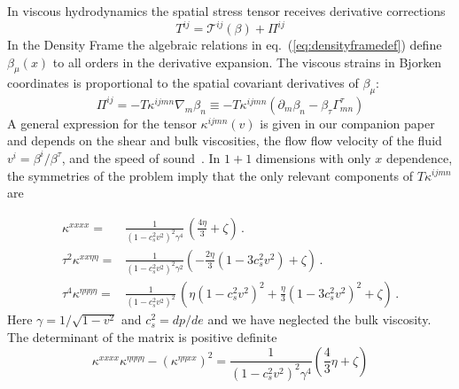 \documentclass[12pt,aps,preprint,nofootinbib,noshowkeys,noshowpacs,longbibliography,superscriptaddress,tightenlines]{revtex4-2}
\def\noisekernel{{\kappa}}
\def\Eq#1{eq.~(\ref{#1})}
\def\st{\begin{equation}}
\def\stp{\end{equation}}
\def\tideal{{\mathcal T}}
\begin{document}
In viscous hydrodynamics the spatial stress tensor  receives derivative corrections
\st
 T^{ij} = \tideal^{ij}(\beta) + \Pi^{ij}
\stp
In the Density Frame the algebraic relations in \Eq{eq:densityframedef} define $\beta_{\mu}(x)$ to all orders in the derivative expansion.
The viscous strains in Bjorken coordinates is proportional to the spatial covariant derivatives of $\beta_{\mu}$:
\st
\label{eq:covderiv}
\Pi^{ij} = -T\kappa^{ijmn} \nabla_{m} \beta_n \equiv - T\kappa^{ijmn} \left( \partial_m \beta_n - \beta_{\tau} \Gamma^{\tau}_{mn} \right)
\stp
A general expression for the tensor $\kappa^{ijmn}(v)$ is given in our companion paper and depends on the shear and bulk viscosities, the flow flow velocity of the fluid $v^i = \beta^i/\beta^{\tau}$, and the speed of sound~\cite{TheoryPaper}.  In  $1+1$ dimensions with only $x$ dependence,  the symmetries of the problem imply that the only relevant components of 
  $T\kappa^{ijmn}$ are 

\begin{align}
\label{eq:noisekernelintro}
\noisekernel^{xxxx} =&     \frac{1}{(1 -c_s^2 v^2)^2 \gamma^4}   \,  \left( \frac{4\eta}{3}  + \zeta \right)    \,. \\
\tau^2\noisekernel^{xx\eta\eta} =&   \frac{1}{(1 - c_s^2 v^2)^2 \gamma^2}  \left(   -  \frac{2\eta}{3} (1 - 3 c_s^2 v^2)  +  \zeta \right) \,. \\
\tau^4\noisekernel^{\eta\eta\eta\eta} =&   \frac{1}{(1- c_s^2 v^2)^2} \,   \left( \eta (1 - c_s^2 v^2)^2 + \frac{\eta}{3} (1 - 3 c_s^2 v^2)^2  + \zeta  \right)\, .
\end{align}
Here $\gamma =1/\sqrt{1-v^2}$  and $c_s^2 = dp/de$ and we have neglected the bulk viscosity. 
The determinant of the matrix is positive definite  
\st
\noisekernel^{xxxx} \noisekernel^{\eta\eta\eta\eta} - (\noisekernel^{\eta\eta xx})^2 = \frac{1}{(1 - c_s^2 v^2)^2 \gamma^4}   \left(\frac{4}{3} \eta + \zeta \right)
\stp
\end{document}
